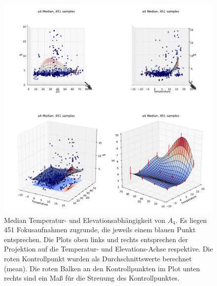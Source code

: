 \begin{figure}[H]
	\centering
	\includegraphics[scale=.48]{psf_surf/a4_med.pdf}
	\caption[Median Temperatur- und Elevationsabhängigkeit von $A_4$]{Median Temperatur- und Elevationsabhängigkeit von $A_4$. Es liegen 451 Fokusaufnahmen zugrunde, die jeweils einem blauen Punkt entsprechen. Die Plots oben links und rechts entsprechen der Projektion auf die Temperatur- und Elevations-Achse respektive. Die roten Kontrollpunkt wurden als Durchschnittswerte berechnet (mean). Die roten Balken an den Kontrollpunkten im Plot unten rechts sind ein Maß für die Streuung des Kontrollpunktes. }
    \label{psf_surf_a4_med_inline}
\end{figure}
